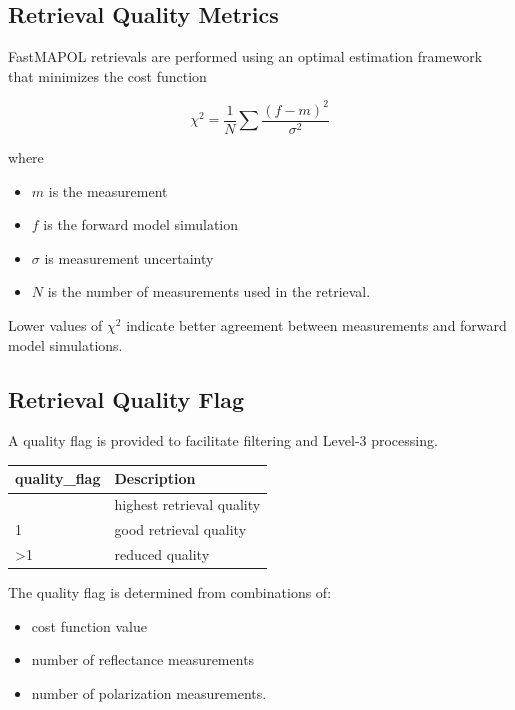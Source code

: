 \documentclass[
  11pt,
  letterpaper,
  DIV=11,
  numbers=noendperiod]{scrreprt}
\providecommand{\tightlist}{%
  \setlength{\itemsep}{0pt}\setlength{\parskip}{0pt}}
\begin{document}
\subsection{Retrieval Quality Metrics}\label{retrieval-quality-metrics}

FastMAPOL retrievals are performed using an optimal estimation framework
that minimizes the cost function

\[
\chi^2 = \frac{1}{N}\sum \frac{(f-m)^2}{\sigma^2}
\]

where

\begin{itemize}
\tightlist
\item
  \(m\) is the measurement\\
\item
  \(f\) is the forward model simulation
\item
  \(\sigma\) is measurement uncertainty\\
\item
  \(N\) is the number of measurements used in the retrieval.
\end{itemize}

Lower values of \(\chi^2\) indicate better agreement between
measurements and forward model simulations.

\subsection{Retrieval Quality Flag}\label{retrieval-quality-flag}

A quality flag is provided to facilitate filtering and Level-3
processing.

\begin{longtable}[]{@{}ll@{}}
\toprule\noalign{}
quality\_flag & Description \\
\midrule\noalign{}
\endhead
\bottomrule\noalign{}
\endlastfoot
0 & highest retrieval quality \\
1 & good retrieval quality \\
\textgreater1 & reduced quality \\
\end{longtable}

The quality flag is determined from combinations of:

\begin{itemize}
\tightlist
\item
  cost function value
\item
  number of reflectance measurements
\item
  number of polarization measurements.
\end{itemize}
\end{document}
